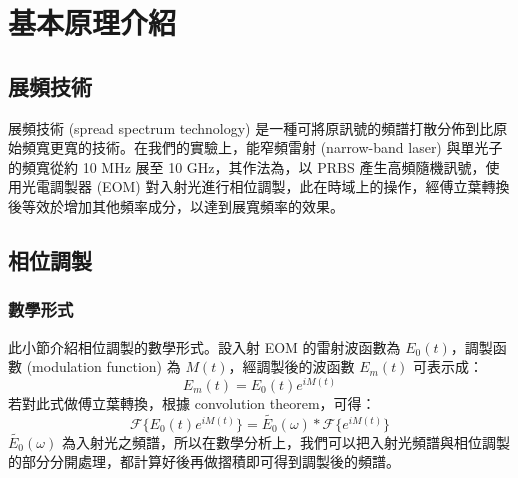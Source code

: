 \documentclass[class=NCU_thesis, crop=false]{standalone}
\begin{document}
\chapter{基本原理介紹}

\section{展頻技術}

展頻技術 (spread spectrum technology) 是一種可將原訊號的頻譜打散分佈到比原始頻寬更寬的技術。在我們的實驗上，能窄頻雷射 (narrow-band laser) 與單光子的頻寬從約 10 MHz 展至 10 GHz，其作法為，以 PRBS 產生高頻隨機訊號，使用光電調製器 (EOM) 對入射光進行相位調製，此在時域上的操作，經傅立葉轉換後等效於增加其他頻率成分，以達到展寬頻率的效果。
\section{相位調製}

\subsection{數學形式}
此小節介紹相位調製的數學形式。設入射 EOM 的雷射波函數為 $E_{0}(t)$，調製函數 (modulation function) 為 $M(t)$，經調製後的波函數 $E_{m}(t)$ 可表示成：
\begin{equation}
    E_{m}(t)=E_{0}(t)e^{iM(t)}
\end{equation}
若對此式做傅立葉轉換，根據 convolution theorem，可得：
\begin{equation}
\label{eq:modulation_function}
    \mathscr{F}\{E_{0}(t)e^{iM(t)}\}=\tilde{E_{0}}(\omega)*\mathscr{F}\{{e^{iM(t)}}\}
\end{equation}
$\tilde{E_{0}}(\omega)$ 為入射光之頻譜，所以在數學分析上，我們可以把入射光頻譜與相位調製的部分分開處理，都計算好後再做摺積即可得到調製後的頻譜。
\end{document}
